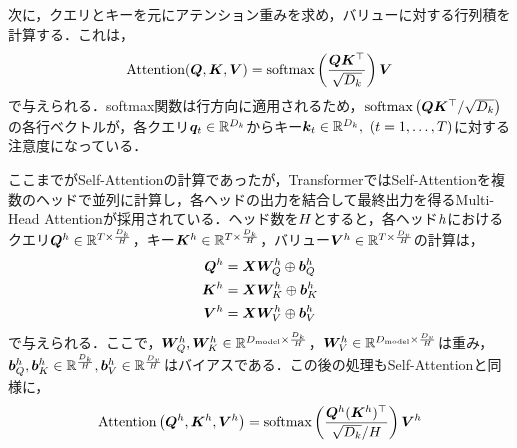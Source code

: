 \documentclass[12pt]{jarticle}
\numberwithin{equation}{section}    %
\numberwithin{figure}{section}      %
\numberwithin{table}{section}      %
\begin{document}
次に，クエリとキーを元にアテンション重みを求め，バリューに対する行列積を計算する．これは，
\begin{equation}
    \text{Attention}(\bm{Q}, \bm{K}, \bm{V}) = \text{softmax}\left(\frac{\bm{Q}\bm{K}^\top}{\sqrt{D_{k}}}\right) \bm{V}
\end{equation}
で与えられる．softmax関数は行方向に適用されるため，$\text{softmax}\left(\bm{Q}\bm{K}^\top / \sqrt{D_{k}}\right)$の各行ベクトルが，各クエリ$\bm{q}_{t} \in \mathbb{R}^{D_{k}}$からキー$\bm{k}_{t} \in \mathbb{R}^{D_{k}}, ~ (t = 1, \ldots, T)$に対する注意度になっている．

ここまでがSelf-Attentionの計算であったが，TransformerではSelf-Attentionを複数のヘッドで並列に計算し，各ヘッドの出力を結合して最終出力を得るMulti-Head Attentionが採用されている．ヘッド数を$H$とすると，各ヘッド$h$におけるクエリ$\bm{Q}^{h} \in \mathbb{R}^{T \times \frac{D_{k}}{H}}$，キー$\bm{K}^{h} \in \mathbb{R}^{T \times \frac{D_{k}}{H}}$，バリュー$\bm{V}^{h} \in \mathbb{R}^{T \times \frac{D_{v}}{H}}$の計算は，
\begin{align}
    \bm{Q}^{h} & = \bm{X}\bm{W}_{Q}^{h} \oplus \bm{b}_{Q}^{h} \\
    \bm{K}^{h} & = \bm{X}\bm{W}_{K}^{h} \oplus \bm{b}_{K}^{h} \\
    \bm{V}^{h} & = \bm{X}\bm{W}_{V}^{h} \oplus \bm{b}_{V}^{h}
\end{align}
で与えられる．ここで，$\bm{W}_{Q}^{h}, \bm{W}_{K}^{h} \in \mathbb{R}^{D_{\text{model}} \times \frac{D_{k}}{H}}$，$\bm{W}_{V}^{h} \in \mathbb{R}^{D_{\text{model}} \times \frac{D_{v}}{H}}$は重み，$\bm{b}_{Q}^{h}, \bm{b}_{K}^{h} \in \mathbb{R}^{\frac{D_{k}}{H}}, \bm{b}_{V}^{h} \in \mathbb{R}^{\frac{D_{v}}{H}}$はバイアスである．この後の処理もSelf-Attentionと同様に，
\begin{equation}
    \text{Attention}\left(\bm{Q}^{h}, \bm{K}^{h}, \bm{V}^{h}\right) = \text{softmax}\left(\frac{\bm{Q}^{h}(\bm{K}^{h})^\top}{\sqrt{D_{k}} / H}\right) \bm{V}^{h}
\end{equation}
\end{document}
